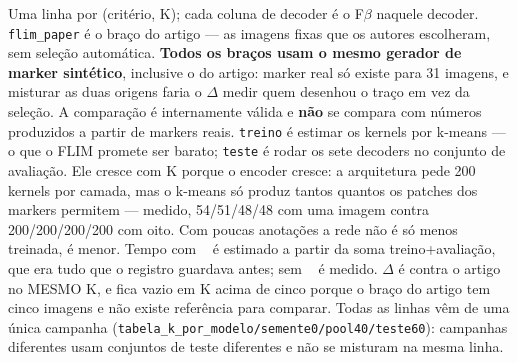 \footnotesize Uma linha por (critério, K); cada coluna de decoder é o F$\beta$ naquele decoder. \texttt{flim\_paper} é o braço do artigo --- as imagens fixas que os autores escolheram, sem seleção automática. \textbf{Todos os braços usam o mesmo gerador de marker sintético}, inclusive o do artigo: marker real só existe para 31 imagens, e misturar as duas origens faria o $\Delta$ medir quem desenhou o traço em vez da seleção. A comparação é internamente válida e \textbf{não} se compara com números produzidos a partir de markers reais. \texttt{treino} é estimar os kernels por k-means --- o que o FLIM promete ser barato; \texttt{teste} é rodar os sete decoders no conjunto de avaliação. Ele cresce com K porque o encoder cresce: a arquitetura pede 200 kernels por camada, mas o k-means só produz tantos quantos os patches dos markers permitem --- medido, 54/51/48/48 com uma imagem contra 200/200/200/200 com oito. Com poucas anotações a rede não é só menos treinada, é menor. Tempo com \texttt{~} é estimado a partir da soma treino+avaliação, que era tudo que o registro guardava antes; sem \texttt{~} é medido. $\Delta$ é contra o artigo no MESMO K, e fica vazio em K acima de cinco porque o braço do artigo tem cinco imagens e não existe referência para comparar. Todas as linhas vêm de uma única campanha (\texttt{tabela\_k\_por\_modelo/semente0/pool40/teste60}): campanhas diferentes usam conjuntos de teste diferentes e não se misturam na mesma linha.
\normalsize
